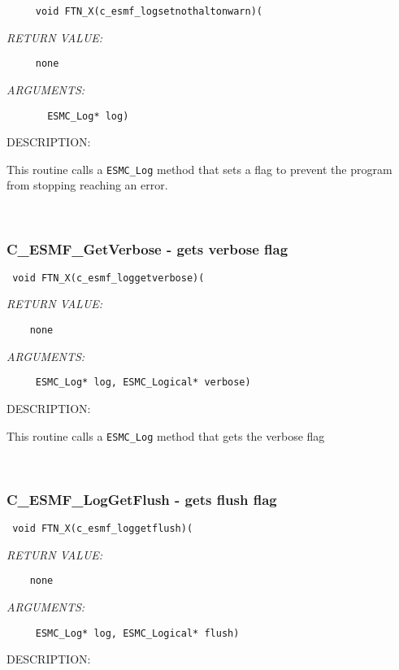  
\begin{verbatim}     void FTN_X(c_esmf_logsetnothaltonwarn)( \end{verbatim}{\em RETURN VALUE:}
\begin{verbatim}     none\end{verbatim}{\em ARGUMENTS:}
\begin{verbatim}       ESMC_Log* log)
                        \end{verbatim}
{\sf DESCRIPTION:\\ }

 
    This routine calls a {\tt ESMC\_Log} method that sets a flag to
    prevent the program
    from stopping reaching an error.                             
 
\mbox{}\hrulefill\ 
 
\subsubsection [C\_ESMF\_GetVerbose] {C\_ESMF\_GetVerbose - gets verbose flag}


  
\begin{verbatim} void FTN_X(c_esmf_loggetverbose)(\end{verbatim}{\em RETURN VALUE:}
\begin{verbatim}    none\end{verbatim}{\em ARGUMENTS:}
\begin{verbatim}     ESMC_Log* log, ESMC_Logical* verbose)\end{verbatim}
{\sf DESCRIPTION:\\ }


    This routine calls a {\tt ESMC\_Log} method that gets the verbose flag
   
 
\mbox{}\hrulefill\ 
 
\subsubsection [C\_ESMF\_LogGetFlush] {C\_ESMF\_LogGetFlush - gets flush flag}


  
\begin{verbatim} void FTN_X(c_esmf_loggetflush)(\end{verbatim}{\em RETURN VALUE:}
\begin{verbatim}    none\end{verbatim}{\em ARGUMENTS:}
\begin{verbatim}     ESMC_Log* log, ESMC_Logical* flush)\end{verbatim}
{\sf DESCRIPTION:\\ }


